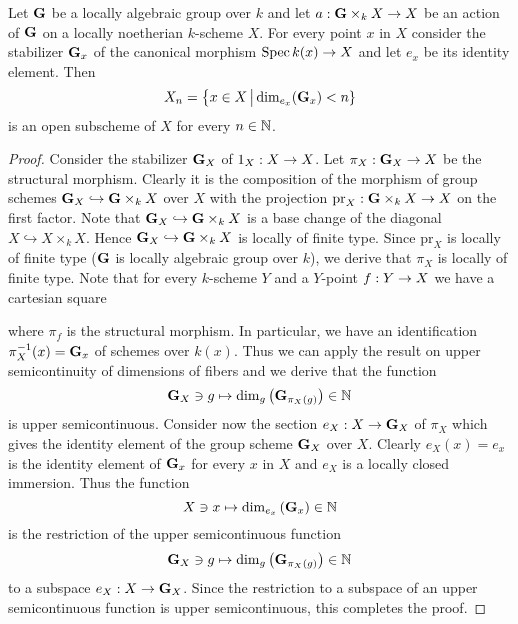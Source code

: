 \begin{theorem}\label{theorem:semicontinuity_of_stablizers_dimension}
Let $\mathbf{G}$ be a locally algebraic group over $k$ and let $a:\mathbf{G}\times_k X\rightarrow X$ be an action of $\mathbf{G}$ on a locally noetherian $k$-scheme $X$. For every point $x$ in $X$ consider the stabilizer $\mathbf{G}_x$ of the canonical morphism $\mathrm{Spec}\, k(x)\rightarrow X$ and let $e_x$ be its identity element. Then
$$X_n = \big\{x\in X\,\big|\,\mathrm{dim}_{e_x}(\mathbf{G}_x) < n\}$$
is an open subscheme of $X$ for every $n\in {\mathbb N}$.
\end{theorem}
\begin{proof}
Consider the stabilizer $\mathbf{G}_X$ of $1_X:X\rightarrow X$. Let $\pi_X:\mathbf{G}_X\rightarrow X$ be the structural morphism. Clearly it is the composition of the morphism of group schemes $\mathbf{G}_X\hookrightarrow \mathbf{G}\times_kX$ over $X$ with the projection $\mathrm{pr}_X:\mathbf{G}\times_kX\rightarrow X$ on the first factor. Note that $\mathbf{G}_X\hookrightarrow \mathbf{G}\times_kX$ is a base change of the diagonal $X\hookrightarrow X\times_kX$. Hence $\mathbf{G}_X\hookrightarrow \mathbf{G}\times_kX$ is locally of finite type. Since $\mathrm{pr}_X$ is locally of finite type ($\mathbf{G}$ is locally algebraic group over $k$), we derive that $\pi_X$ is locally of finite type. Note that for every $k$-scheme $Y$ and a $Y$-point $f:Y\rightarrow X$ we have a cartesian square
\begin{center}
\end{center}
where $\pi_f$ is the structural morphism. In particular, we have an identification $\pi_X^{-1}(x) = \mathbf{G}_x$ of schemes over $k(x)$. Thus we can apply the result on upper semicontinuity of dimensions of fibers {\cite[Theorem 14.110]{gortz2010algebraic}} and we derive that the function
$$\mathbf{G}_X\ni g\mapsto \mathrm{dim}_g\left(\mathbf{G}_{\pi_X(g)}\right)\in {\mathbb N}$$
is upper semicontinuous. Consider now the section $e_X:X\rightarrow \mathbf{G}_X$ of $\pi_X$ which gives the identity element of the group scheme $\mathbf{G}_X$ over $X$. Clearly $e_X(x) = e_x$ is the identity element of $\mathbf{G}_x$ for every $x$ in $X$ and $e_X$ is a locally closed immersion. Thus the function
$$X\ni x\mapsto \mathrm{dim}_{e_x}\left(\mathbf{G}_{x}\right)\in {\mathbb N}$$
is the restriction of the upper semicontinuous function
$$\mathbf{G}_X\ni g\mapsto \mathrm{dim}_g\left(\mathbf{G}_{\pi_X(g)}\right)\in {\mathbb N}$$
to a subspace $e_X:X\rightarrow \mathbf{G}_X$. Since the restriction to a subspace of an upper semicontinuous function is upper semicontinuous, this completes the proof.
\end{proof}

